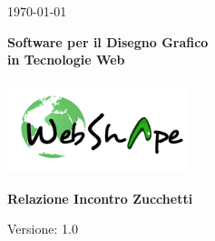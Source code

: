 
\title{\TITOLODOC}
\author{Bizzotto Piero}



\renewcommand{\insertversion}{1.0} %
\renewcommand{\TITOLODOC}{Relazione Incontro Zucchetti} %
\renewcommand{\glosspath}{.\glossario} %

\begin{titlepage}
\begin{center}
	\begin{Large}	\today \end{Large}
\end{center}

\vspace{20pt}

\begin{center}
	\begin{Huge}
				\textbf{\ajax}
	\end{Huge}
\end{center}			

\begin{center}
	\begin{large}
				\textbf{Software per il Disegno Grafico\\ in Tecnologie Web}
	\end{large}
\end{center}			

\vspace{20pt}

\begin{center}
\includegraphics[width=150pt]{../logo/logo}
\end{center}

\vspace{160pt}
\begin{center} %
	\begin{Huge}
				\textbf{\TITOLODOC}
	\end{Huge}
\end{center}
\vspace{210pt}
\begin{center}
Versione: \insertversion
\end{center}
\end{titlepage}

